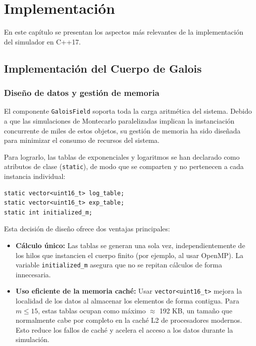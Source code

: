 \chapter{Implementación}
\label{cap:implementacion}

En este capítulo se presentan los aspectos más relevantes de la implementación del simulador en C++17.

\section{Implementación del Cuerpo de Galois}
\label{sec:galois_field}

\subsection{Diseño de datos y gestión de memoria}
El componente \texttt{GaloisField} soporta toda la carga aritmética del sistema. Debido a que las simulaciones de Montecarlo paralelizadas implican la instanciación concurrente de miles de estos objetos, su gestión de memoria ha sido diseñada para minimizar el consumo de recursos del sistema.

Para lograrlo, las tablas de exponenciales y logaritmos se han declarado como atributos de clase (\texttt{static}), de modo que se comparten y no pertenecen a cada instancia individual:

\begin{lstlisting}[style=CodigoCPP, caption={Declaración de los atributos estáticos para el precálculo compartido.}, label={lst:gf_atributos_estaticos}]
static vector<uint16_t> log_table;
static vector<uint16_t> exp_table;
static int initialized_m; 
\end{lstlisting}

Esta decisión de diseño ofrece dos ventajas principales:
\begin{itemize}
    \item \textbf{Cálculo único:} Las tablas se generan una sola vez, independientemente de los hilos que instancien el cuerpo finito (por ejemplo, al usar OpenMP). La variable \texttt{initialized\_m} asegura que no se repitan cálculos de forma innecesaria.
    \item \textbf{Uso eficiente de la memoria caché:} Usar \texttt{vector<uint16\_t>} mejora la localidad de los datos al almacenar los elementos de forma contigua. Para $m\leq15$, estas tablas ocupan como máximo $\approx$ 192 KB, un tamaño que normalmente cabe por completo en la caché L2 de procesadores modernos. Esto reduce los fallos de caché y acelera el acceso a los datos durante la simulación.
\end{itemize}

